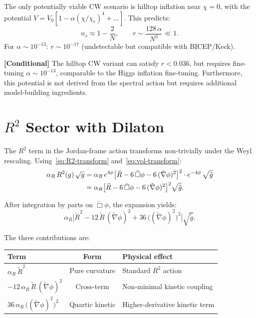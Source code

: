 \documentclass[11pt,a4paper]{article}
\theoremstyle{plain}
\theoremstyle{definition}
\newcommand{\conditional}[1]{%
  \par\smallskip\noindent
  \colorbox{yellow!15}{\parbox{\dimexpr\linewidth-2\fboxsep}{%
    \textcolor{orange!60!black}{\textbf{[Conditional]}} #1}}%
  \par\smallskip}
\begin{document}
The only potentially viable CW scenario is hilltop inflation near
$\chi = 0$, with the potential $V = V_0[1 - \alpha(\chi/\chi_c)^4 + \ldots]$.
This predicts:
\begin{equation}
  n_s \approx 1 - \frac{2}{N}, \qquad
  r \sim \frac{128\,\alpha}{N^3} \ll 1.
\end{equation}
For $\alpha \sim 10^{-13}$: $r \sim 10^{-17}$ (undetectable but
compatible with BICEP/Keck).

\conditional{The hilltop CW variant can satisfy $r < 0.036$,
but requires fine-tuning $\alpha \sim 10^{-13}$, comparable to the
Higgs inflation fine-tuning.  Furthermore, this potential is not
derived from the spectral action but requires additional
model-building ingredients.}

\section{$R^2$ Sector with Dilaton}\label{sec:R2}

The $R^2$ term in the Jordan-frame action transforms non-trivially
under the Weyl rescaling.  Using~\eqref{eq:R2-transform}
and~\eqref{eq:vol-transform}:
\begin{align}
  \alpha_R\,R^2(g)\,\sqrt{g}
  &= \alpha_R\,e^{4\phi}\bigl[\tilde{R}
    - 6\,\tilde{\Box}\phi
    - 6\,(\tilde{\nabla}\phi)^2\bigr]^2
  \cdot e^{-4\phi}\,\sqrt{\tilde{g}}
  \notag\\
  &= \alpha_R\bigl[\tilde{R}
    - 6\,\tilde{\Box}\phi
    - 6\,(\tilde{\nabla}\phi)^2\bigr]^2\sqrt{\tilde{g}}.
  \label{eq:R2-einstein}
\end{align}

After integration by parts on $\tilde{\Box}\phi$, the expansion
yields:
\begin{equation}\label{eq:R2-expanded}
  \alpha_R\bigl[\tilde{R}^2
  - 12\,\tilde{R}\,(\tilde{\nabla}\phi)^2
  + 36\,\bigl((\tilde{\nabla}\phi)^2\bigr)^2\bigr]
  \sqrt{\tilde{g}}.
\end{equation}

The three contributions are:
\begin{center}
\begin{tabular}{lcl}
\toprule
Term & Form & Physical effect \\
\midrule
$\alpha_R\,\tilde{R}^2$ & Pure curvature & Standard $R^2$ action \\
$-12\,\alpha_R\,\tilde{R}\,(\tilde{\nabla}\phi)^2$
  & Cross-term & Non-minimal kinetic coupling \\
$36\,\alpha_R\,\bigl((\tilde{\nabla}\phi)^2\bigr)^2$
  & Quartic kinetic & Higher-derivative kinetic term \\
\bottomrule
\end{tabular}
\end{center}
\end{document}
